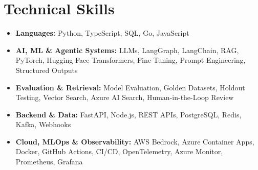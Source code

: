\documentclass[letterpaper,10.5pt]{article}
\newcommand{\resumeItem}[1]{
  \item{#1}\par\vspace{-2pt}
}
\newcommand{\resumeItemListStart}{
  \begin{itemize}[
    leftmargin=0.15in,
    itemsep=0pt,
    topsep=0pt,
    parsep=0pt,
    partopsep=0pt
  ]
}
\newcommand{\resumeItemListEnd}{
  \end{itemize}\vspace{-4pt}
}
\begin{document}
\section{Technical Skills}
\resumeItemListStart
  \resumeItem{
    \textbf{Languages:}
    Python, TypeScript, SQL, Go, JavaScript
  }
  \resumeItem{
    \textbf{AI, ML \& Agentic Systems:}
    LLMs, LangGraph, LangChain, RAG, PyTorch,
    Hugging Face Transformers, Fine-Tuning,
    Prompt Engineering, Structured Outputs
  }
  \resumeItem{
    \textbf{Evaluation \& Retrieval:}
    Model Evaluation, Golden Datasets, Holdout Testing,
    Vector Search, Azure AI Search, Human-in-the-Loop Review
  }
  \resumeItem{
    \textbf{Backend \& Data:}
    FastAPI, Node.js, REST APIs, PostgreSQL,
    Redis, Kafka, Webhooks
  }
  \resumeItem{
    \textbf{Cloud, MLOps \& Observability:}
    AWS Bedrock, Azure Container Apps, Docker,
    GitHub Actions, CI/CD, OpenTelemetry,
    Azure Monitor, Prometheus, Grafana
  }
\resumeItemListEnd
\end{document}
